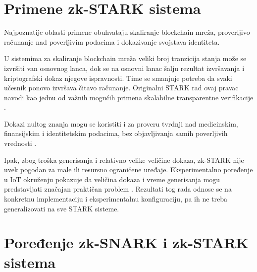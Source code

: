 \section{Primene zk-STARK sistema}

Najpoznatije oblasti primene obuhvataju skaliranje blockchain mreža, proverljivo
računanje nad poverljivim podacima i dokazivanje svojstava identiteta.

U sistemima za skaliranje blockchain mreža veliki broj tranzicija stanja može se
izvršiti van osnovnog lanca, dok se na osnovni lanac šalju rezultat izvršavanja i
kriptografski dokaz njegove ispravnosti. Time se smanjuje potreba da svaki učesnik
ponovo izvršava čitavo računanje. Originalni STARK rad ovaj pravac navodi kao jednu
od važnih mogućih primena skalabilne transparentne verifikacije
\cite{stark2018}.

Dokazi nultog znanja mogu se koristiti i za proveru tvrdnji nad medicinskim,
finansijskim i identitetskim podacima, bez objavljivanja samih poverljivih
vrednosti \cite{lavin2024survey}.

Ipak, zbog troška generisanja i relativno velike veličine dokaza, zk-STARK nije
uvek pogodan za male ili resursno ograničene uređaje. Eksperimentalno poređenje
u IoT okruženju pokazuje da veličina dokaza i vreme generisanja mogu predstavljati
značajan praktičan problem \cite{comparison2025}. Rezultati tog rada odnose se na
konkretnu implementaciju i eksperimentalnu konfiguraciju, pa ih ne treba
generalizovati na sve STARK sisteme.


\section{Poređenje zk-SNARK i zk-STARK sistema}

